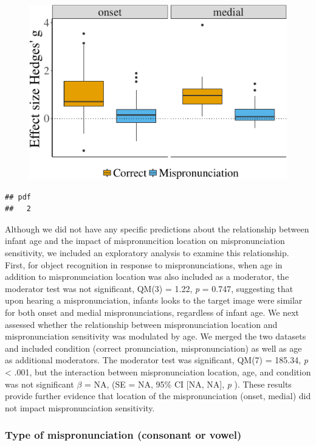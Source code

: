 \documentclass[man]{apa6}
\theoremstyle{definition}
\theoremstyle{definition}
\theoremstyle{definition}
\theoremstyle{remark}
\begin{document}
\begin{figure}[htbp]
\centering
\includegraphics{Paper_Analyses_files/figure-latex/PlotPositionEffect-1.pdf}
\caption{}
\end{figure}

\begin{verbatim}
## pdf 
##   2
\end{verbatim}

Although we did not have any specific predictions about the relationship
between infant age and the impact of mispronuncition location on
mispronunciation sensitivity, we included an exploratory analysis to
examine this relationship. First, for object recognition in response to
mispronunciations, when age in addition to mispronunciation location was
also included as a moderator, the moderator test was not significant,
QM(3) = 1.22, \emph{p} = 0.747, suggesting that upon hearing a
mispronunciation, infants looks to the target image were similar for
both onset and medial mispronunciations, regardless of infant age. We
next assessed whether the relationship between mispronunciation location
and mispronunciation sensitivity was modulated by age. We merged the two
datasets and included condition (correct pronunciation,
mispronunciation) as well as age as additional moderators. The moderator
test was significant, QM(7) = 185.34, \emph{p} \textless{} .001, but the
interaction between mispronunciation location, age, and condition was
not significant \(\beta\) = NA, (SE = NA, 95\% CI {[}NA, NA{]}, \emph{p}
). These results provide further evidence that location of the
mispronunciation (onset, medial) did not impact mispronunciation
sensitivity.

\subsubsection{Type of mispronunciation (consonant or
vowel)}\label{type-of-mispronunciation-consonant-or-vowel}
\end{document}

